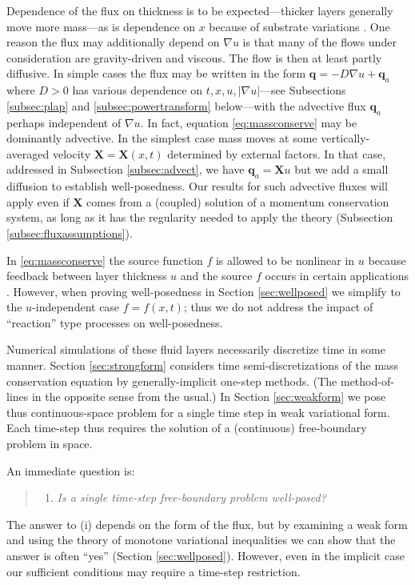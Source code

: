 \documentclass[final,onefignum]{siamart190516}
\newcommand\bq{\mathbf{q}}
\newcommand\bX{\mathbf{X}}
\newcommand{\grad}{\nabla}
\begin{document}
Dependence of the flux on thickness is to be expected---thicker layers generally move more mass---as is dependence on $x$ because of substrate variations \cite[for example]{Bueler2016}.  One reason the flux may additionally depend on $\grad u$ is that many of the flows under consideration are gravity-driven and viscous.  The flow is then at least partly diffusive.  In simple cases the flux may be written in the form $\bq=- D \grad u + \bq_a$ where $D > 0$ has various dependence on $t,x,u,|\grad u|$---see Subsections \ref{subsec:plap} and \ref{subsec:powertransform} below---with the advective flux $\bq_a$ perhaps independent of $\grad u$.  In fact, equation \eqref{eq:massconserve} may be dominantly advective.  In the simplest case mass moves at some vertically-averaged velocity $\bX=\bX(x,t)$ determined by external factors.  In that case, addressed in Subsection \ref{subsec:advect}, we have $\bq_a = \bX u$ but we add a small diffusion to establish well-posedness.  Our results for such advective fluxes will apply even if $\bX$ comes from a (coupled) solution of a momentum conservation system, as long as it has the regularity needed to apply the theory (Subsection \ref{subsec:fluxassumptions}).

In \eqref{eq:massconserve} the source function $f$ is allowed to be nonlinear in $u$ because feedback between layer thickness $u$ and the source $f$ occurs in certain applications \cite{Jouvetetal2011}.  However, when proving well-posedness in Section \ref{sec:wellposed} we simplify to the $u$-independent case $f=f(x,t)$; thus we do not address the impact of ``reaction'' type processes on well-posedness.

Numerical simulations of these fluid layers necessarily discretize time in some manner.  Section \ref{sec:strongform} considers time semi-discretizations of the mass conservation equation by generally-implicit one-step methods.  (The method-of-lines in the opposite sense from the usual.)  In Section \ref{sec:weakform} we pose thus continuous-space problem for a single time step in weak variational form.  Each time-step thus requires the solution of a (continuous) free-boundary problem in space.

An immediate question is:
  \begin{quote}
  \renewcommand{\labelenumi}{(\roman{enumi})}
  \begin{enumerate}
  \item \emph{Is a single time-step free-boundary problem well-posed?}
  \end{enumerate}
  \end{quote}
The answer to (i) depends on the form of the flux, but by examining a weak form and using the theory of monotone variational inequalities \cite{KinderlehrerStampacchia1980} we can show that the answer is often ``yes'' (Section \ref{sec:wellposed}).  However, even in the implicit case our sufficient conditions may require a time-step restriction.
\end{document}
